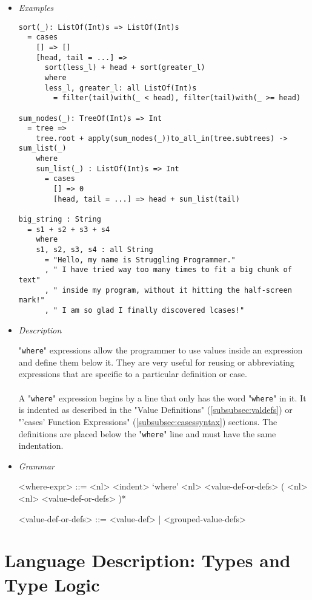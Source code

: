\documentclass{article}
\begin{document}
\begin{itemize}

\item \textit{Examples}
\begin{verbatim}
sort(_): ListOf(Int)s => ListOf(Int)s
  = cases
    [] => []
    [head, tail = ...] =>
      sort(less_l) + head + sort(greater_l)
      where
      less_l, greater_l: all ListOf(Int)s
        = filter(tail)with(_ < head), filter(tail)with(_ >= head)

sum_nodes(_): TreeOf(Int)s => Int
  = tree =>
    tree.root + apply(sum_nodes(_))to_all_in(tree.subtrees) -> sum_list(_)
    where
    sum_list(_) : ListOf(Int)s => Int
      = cases
        [] => 0
        [head, tail = ...] => head + sum_list(tail)

big_string : String
  = s1 + s2 + s3 + s4
    where
    s1, s2, s3, s4 : all String
      = "Hello, my name is Struggling Programmer."
      , " I have tried way too many times to fit a big chunk of text"
      , " inside my program, without it hitting the half-screen mark!"
      , " I am so glad I finally discovered lcases!"
\end{verbatim}

\item \textit{Description}

"\verb|where|" expressions allow the programmer to use values inside an
expression and define them below it. They are very useful for reusing or
abbreviating expressions that are specific to a particular definition or case.
\\\\
A "\verb|where|" expression begins by a line that only has the word
"\verb|where|" in it. It is indented as described in the "Value Definitions"
(\ref{subsubsec:valdefs}) or "'cases' Function Expressions"
(\ref{subsubsec:casessyntax}) sections.  The definitions are placed below the
"\verb|where|" line and must have the same indentation.

\item \textit{Grammar}
\begin{grammar}
<where-expr> ::=
<nl> <indent> `where'
<nl> <value-def-or-defs> ( <nl> <nl> <value-def-or-defs> )*

<value-def-or-defs> ::= <value-def> | <grouped-value-defs>
\end{grammar}

\end{itemize}

\newpage

\section{Language Description: Types and Type Logic}
\end{document}
